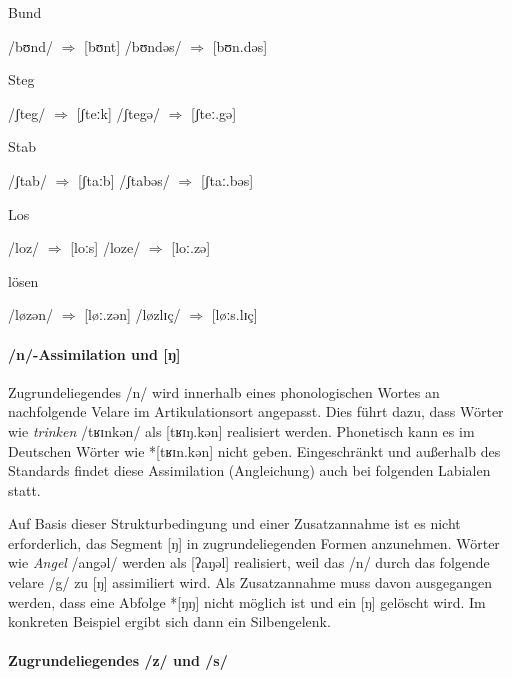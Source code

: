 \begin{exe}
  \ex Bund \label{ex:endranddesonorisierung001}
  \begin{xlist}
    \ex /bʊnd/ $\Rightarrow$ [bʊnt]
    \ex /bʊndəs/ $\Rightarrow$ [bʊn.dəs]
  \end{xlist}
  \ex Steg \label{ex:endranddesonorisierung002}
  \begin{xlist}
    \ex /ʃteg/ $\Rightarrow$ [ʃteːk]
    \ex /ʃtegə/ $\Rightarrow$ [ʃteː.gə]
  \end{xlist}
  \ex Stab \label{ex:endranddesonorisierung003}
  \begin{xlist}
    \ex /ʃtab/ $\Rightarrow$ [ʃtaːb]
    \ex /ʃtabəs/ $\Rightarrow$ [ʃtaː.bəs]
  \end{xlist}
  \ex Los \label{ex:endranddesonorisierung004}
  \begin{xlist}
    \ex /loz/ $\Rightarrow$ [loːs]
    \ex /loze/ $\Rightarrow$ [loː.zə]
  \end{xlist}
  \ex lösen \label{ex:endranddesonorisierung005}
  \begin{xlist}
    \ex /løzən/ $\Rightarrow$ [løː.zən]
    \ex /løzlɪç/ $\Rightarrow$ [løːs.lɪç]
  \end{xlist}
\end{exe}

\paragraph*{/n/-Assimilation und [ŋ]}

Zugrundeliegendes /n/ wird innerhalb eines phonologischen Wortes an nachfolgende Velare im Artikulationsort angepasst.
Dies führt dazu, dass Wörter wie \textit{trinken} /tʁɪnkən/ als [tʁɪŋ.kən] realisiert werden.
Phonetisch kann es im Deutschen Wörter wie *[tʁɪn.kən] nicht geben.
Eingeschränkt und außerhalb des Standards findet diese Assimilation (Angleichung) auch bei folgenden Labialen statt.

Auf Basis dieser Strukturbedingung und einer Zusatzannahme ist es nicht erforderlich, das Segment [ŋ] in zugrundeliegenden Formen anzunehmen.
Wörter wie \textit{Angel} /angəl/ werden als [ʔaŋ̣əl] realisiert, weil das /n/ durch das folgende velare /g/  zu [ŋ] assimiliert wird.
Als Zusatzannahme muss davon ausgegangen werden, dass eine Abfolge *[ŋŋ] nicht möglich ist und ein [ŋ] gelöscht wird.
Im konkreten Beispiel ergibt sich dann ein Silbengelenk.

\paragraph*{Zugrundeliegendes /z/ und /s/}

